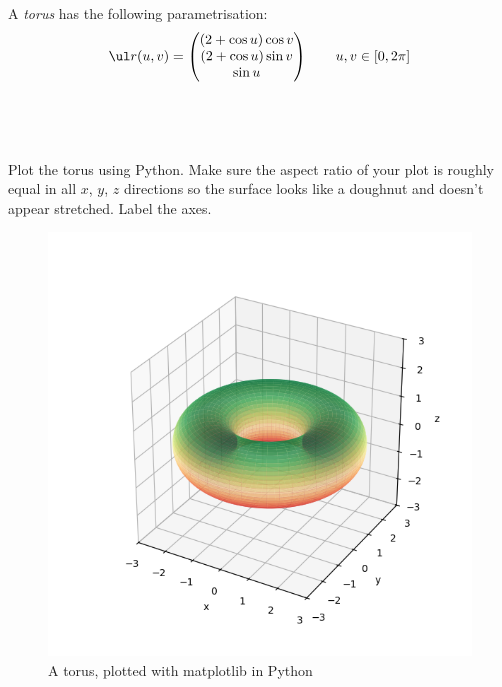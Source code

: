 \documentclass[a4paper]{article}
\begin{document}


\begin{questionbody}
A \textit{torus} has the following parametrisation: \[
\ul r(u, v) = \begin{pmatrix}
(2 + \cos u) \cos v \\
(2 + \cos u) \sin v \\
\sin u
\end{pmatrix} \qquad u, v \in [0, 2\pi]
\]
\end{questionbody}

\subsection{~} %

\begin{questionbody}
Plot the torus using Python. Make sure the aspect ratio of your plot is roughly equal in all $x$, $y$, $z$ directions so the surface looks like a doughnut and doesn't appear stretched. Label the axes.
\end{questionbody}

\begin{figure}[h]
    \centering
    \includegraphics[scale=0.8]{Q3a-torus}
    \caption{A torus, plotted with matplotlib in Python}%
    \label{fig:torus-plot}
\end{figure}
\end{document}
